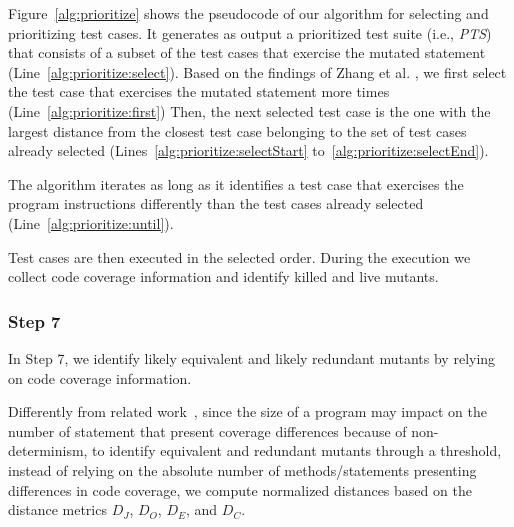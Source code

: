 Figure~\ref{alg:prioritize} shows the pseudocode of our algorithm for selecting and prioritizing test cases. It generates as output
a prioritized test suite (i.e., \emph{PTS}) that consists of a subset of the test cases that exercise the mutated statement (Line~\ref{alg:prioritize:select}).
Based on the findings of Zhang et al. \cite{zhang2013faster}, we first select the test case that exercises the mutated statement more times (Line~\ref{alg:prioritize:first}) 
Then, the next selected test case is the one with the largest distance from the closest test case belonging to the set of test cases already selected (Lines~\ref{alg:prioritize:selectStart} to~\ref{alg:prioritize:selectEnd}). 


The algorithm iterates as long as it identifies a test case that exercises 
the program instructions differently than the test cases already selected (Line~\ref{alg:prioritize:until}).

Test cases are then executed in the selected order. During the execution we collect code coverage information and identify killed and live mutants.



\subsubsection{Step 7}


In Step 7, we identify likely equivalent and likely redundant mutants by relying on code coverage information.

Differently from related work~\cite{schuler2013covering}, since the size of a program may impact on the number of statement that present coverage differences because of non-determinism, 
to identify equivalent and redundant mutants through a threshold, instead of relying on the absolute number of methods/statements presenting differences in code coverage, we compute normalized distances based on the distance metrics $D_J$, $D_O$, $D_E$, and $D_C$. 

